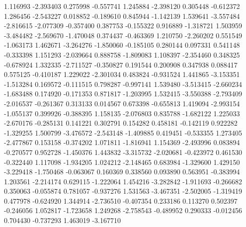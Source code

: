 1.116993
-2.393403
0.275998
-0.557741
1.245884
-2.398120
0.305448
-0.612372
1.286456
-2.543227
0.018852
-0.189610
0.845944
-1.142139
1.539641
-3.557484
-2.816615
-2.077309
-0.357400
0.387753
-0.155322
0.916889
-1.318721
1.503959
-3.484482
-2.569670
-1.470048
0.374437
-0.463369
1.210750
-2.260202
0.551549
-1.063173
1.462671
-3.264276
-1.850060
-0.185105
0.280144
0.097331
0.541148
-0.333398
1.151293
-2.039664
0.888758
-1.809083
1.108397
-2.354460
0.348325
-0.678924
1.332335
-2.711527
-0.350827
0.191544
0.200908
0.347938
0.088417
0.575125
-0.410187
1.229022
-2.301034
0.483824
-0.931524
1.441865
-3.153351
-1.513284
0.169572
-0.111515
0.798287
-0.997141
1.539480
-3.513415
-2.660234
-1.683488
0.174920
-0.171353
0.871817
-1.203995
1.532415
-3.550388
-2.793409
-2.016537
-0.261367
0.313133
0.014567
0.673398
-0.655813
1.419094
-2.993154
-1.055137
0.399926
-0.388395
1.158135
-2.076803
0.835788
-1.682122
1.225033
-2.670176
-0.285131
0.141221
0.302791
0.154282
0.458181
-0.142119
0.922282
-1.329255
1.500799
-3.476572
-2.543148
-1.409885
0.419451
-0.533355
1.273405
-2.477867
0.153158
-0.374202
1.071811
-1.816941
1.154369
-2.493996
0.083894
-0.270577
0.952728
-1.450376
1.443832
-3.315732
-2.020681
-0.423972
0.461530
-0.322440
1.117098
-1.934205
1.024212
-2.148465
0.683984
-1.329600
1.429150
-3.229418
-1.750468
-0.063067
0.160369
0.338560
0.093890
0.563951
-0.383994
1.203561
-2.214174
0.629115
-1.222064
1.454216
-3.282842
-1.911693
-0.266682
0.350063
-0.055874
0.781057
-0.937276
1.531563
-3.467351
-2.502005
-1.319419
0.477978
-0.624920
1.344914
-2.736510
-0.407354
0.233186
0.113270
0.502397
-0.246056
1.052817
-1.723658
1.249268
-2.758543
-0.489952
0.290333
-0.012456
0.704430
-0.737293
1.463019
-3.167710
